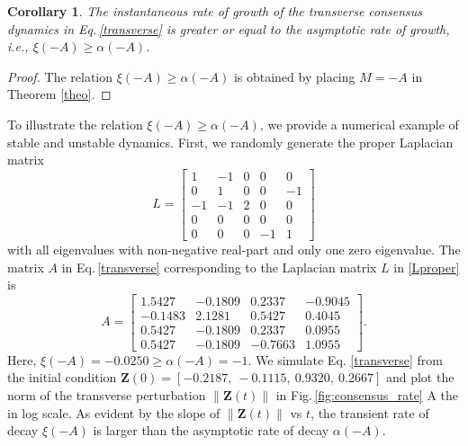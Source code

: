 \documentclass[%
 reprint,
 amsmath,amssymb,
 aip,
]{revtex4-2}
\def \bZ {\pmb{Z}}
\theoremstyle{italichead}
\newtheorem{corollary}[theorem]{Corollary}
\theoremstyle{definition}
\begin{document}
{\begin{corollary}
    The instantaneous rate of growth of the transverse consensus dynamics in Eq.\,\eqref{transverse} is greater or equal to the asymptotic rate of growth, i.e., $\xi (-A) \geq \alpha (-A)$.
\end{corollary}
\begin{proof}
    The relation $\xi (-A) \geq \alpha (-A)$ is obtained by placing $M = -A$ in Theorem \ref{theo}.
\end{proof}


To illustrate the relation $\xi (-A) \geq \alpha (-A)$, we provide a numerical example of stable and unstable dynamics.
First, we randomly generate the proper Laplacian matrix
\begin{equation} \label{Lproper}
    L = \begin{bmatrix}
    1 & -1 & 0 & 0 & 0 \\ 
    0 & 1 & 0 & 0 & -1 \\ 
    -1 & -1 & 2 & 0 & 0 \\ 
    0 & 0 & 0 & 0 & 0 \\ 
    0 & 0 & 0 & -1 & 1 
    \end{bmatrix}
\end{equation}
with all eigenvalues with non-negative real-part and only one zero eigenvalue.
The matrix $A$ in Eq.\,\eqref{transverse} corresponding to the Laplacian matrix $L$ in \eqref{Lproper} is
\begin{equation}
    A = \begin{bmatrix}
    1.5427 & -0.1809 & 0.2337 & -0.9045 \\ 
    -0.1483 & 2.1281 & 0.5427 & 0.4045 \\ 
    0.5427 & -0.1809 & 0.2337 & 0.0955 \\ 
    0.5427 & -0.1809 & -0.7663 & 1.0955 
    \end{bmatrix}.
\end{equation}
Here, $\xi(-A) = -0.0250 \geq \alpha(-A) = -1$. 
We simulate Eq.\,\,\eqref{transverse} from the initial condition $\bZ(0) = [-0.2187,\ -0.1115,\ 0.9320 ,\ 0.2667 ]$ and plot the norm of the transverse perturbation $\| \bZ(t) \|$ in Fig.\,\ref{fig:consensus_rate} A the in log scale.
As evident by the slope of $\| \bZ(t) \|$ vs $t$, the transient rate of decay $\xi(-A)$ is larger than the asymptotic rate of decay $\alpha(-A)$.

}
\end{document}
